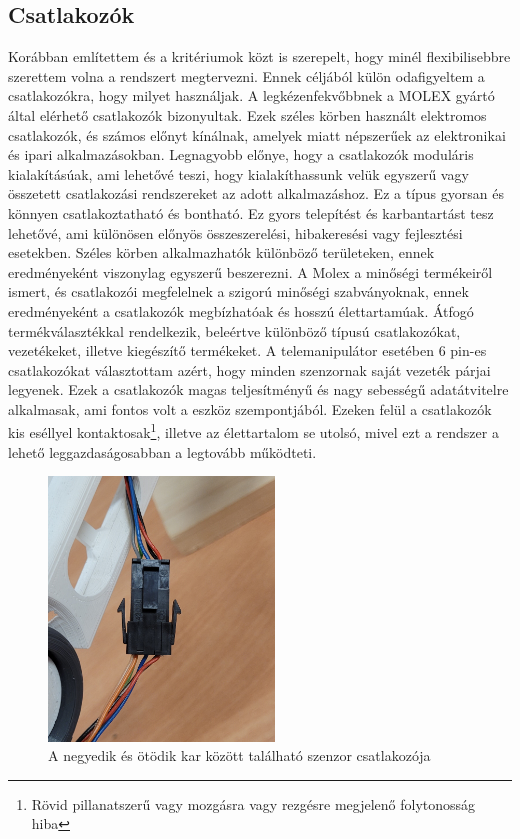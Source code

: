 \subsection{Csatlakozók}

Korábban említettem és a kritériumok közt is szerepelt, hogy minél flexibilisebbre szerettem volna a rendszert megtervezni. Ennek céljából külön odafigyeltem a csatlakozókra, hogy milyet használjak. A legkézenfekvőbbnek a MOLEX gyártó által elérhető csatlakozók bizonyultak. Ezek széles körben használt elektromos csatlakozók, és számos előnyt kínálnak, amelyek miatt népszerűek az elektronikai és ipari alkalmazásokban. Legnagyobb előnye, hogy a csatlakozók moduláris kialakításúak, ami lehetővé teszi, hogy kialakíthassunk velük egyszerű vagy összetett csatlakozási rendszereket az adott alkalmazáshoz. Ez a típus gyorsan és könnyen csatlakoztatható és bontható. Ez gyors telepítést és karbantartást tesz lehetővé, ami különösen előnyös összeszerelési, hibakeresési vagy fejlesztési esetekben. Széles körben alkalmazhatók különböző területeken, ennek eredményeként viszonylag egyszerű beszerezni. A Molex a minőségi termékeiről ismert, és csatlakozói megfelelnek a szigorú minőségi szabványoknak, ennek eredményeként a csatlakozók megbízhatóak és hosszú élettartamúak. Átfogó termékválasztékkal rendelkezik, beleértve különböző típusú csatlakozókat, vezetékeket, illetve kiegészítő termékeket. A telemanipulátor esetében 6 pin-es csatlakozókat választottam azért, hogy minden szenzornak saját vezeték párjai legyenek. Ezek a csatlakozók magas teljesítményű és nagy sebességű adatátvitelre alkalmasak, ami fontos volt a eszköz szempontjából. Ezeken felül a csatlakozók kis eséllyel kontaktosak\footnote{Rövid pillanatszerű vagy mozgásra vagy rezgésre megjelenő folytonosság hiba}, illetve az élettartalom se utolsó, mivel ezt a rendszer a lehető leggazdaságosabban a legtovább működteti.\cite{vezetekellen}

\begin{figure}[!ht]
\centering
\includegraphics[width=60mm, keepaspectratio]{figures/Csuklo_szog_teszt/molex_valos}
\caption{A negyedik és ötödik kar között található szenzor csatlakozója}
\label{fig:csuklo_csatlakozo}
\end{figure}

